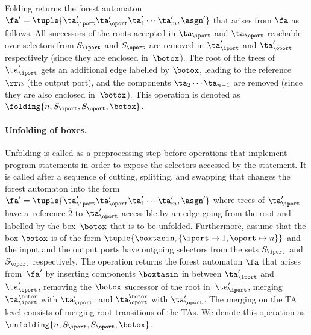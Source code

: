 {Folding returns the forest automaton $\fa' = \tuple{\ta'_{\iport}
\ta'_{\oport} \ta'_1 \cdots \ta'_m, \asgn'}$ that arises from $\fa$ as follows.
All successors of the roots accepted in $\ta_\iport$ and $\ta_\oport$
reachable over selectors from $S_\iport$ and $S_\oport$
are removed in $\ta'_\iport$ and $\ta'_\oport$ respectively (since they are enclosed in~$\botox$).
The root of the trees of $\ta'_\iport$ gets an additional edge labelled by
$\botox$, leading to the reference $\rr n$ (the output port),
and the components $\ta_2 \cdots \ta_{n-1}$ are removed (since they are also enclosed in~$\botox$).
%
This operation is denoted as $\folding{n,S_{\iport},S_{\oport},\botox}$.
%

\paragraph{Unfolding of boxes.} 
Unfolding is called as a preprocessing step before operations that implement
program statements
in order to expose the selectors accessed by the statement. 
It is called after a sequence of cutting, splitting, and swapping
that changes the forest automaton into the form 
$\fa' = \tuple{\ta_\iport'\ta_\oport'\ta_1'\cdots\ta_m',\asgn'}$ where
%
%
trees of $\ta'_\iport$ have a~reference $\overline 2$ to $\ta_\oport'$ accessible by an 
edge going from the root and labelled by the box~$\botox$ that is to be unfolded.
%
Furthermore, assume that the box $\botox$ is of the form
$\tuple{\boxtasin,\{\iport\mapsto 1,\oport\mapsto n\}}$
%
and 
%
the input and the output ports have outgoing selectors from the sets 
$S_\iport$ and $S_\oport$ respectively. 
%
The operation returns the forest automaton 
$\fa$ that arises from~$\fa'$ by 
%
inserting components $\boxtasin$ in between $\ta'_\iport$ and $\ta'_\oport$, 
removing the $\botox$ successor of the root in~$\ta_\iport'$,
merging $\ta_\iport^\botox$ with $\ta_\iport'$, and $\ta_\oport^\botox$
with $\ta_\oport'$.
The merging on the TA level consists of merging root transitions of the TAs.
%
We denote this operation as $\unfolding{n,S_{\iport},S_{\oport},\botox}$.

}
